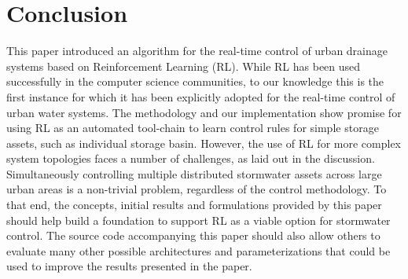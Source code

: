 \section{Conclusion}
This paper introduced an algorithm for the real-time control of urban drain\-age systems based on Reinforcement Learning (RL).
While RL has been used successfully in the computer science communities, to our knowledge this is the first instance for which it has been explicitly adopted for the real-time control of urban water systems.
The methodology and our implementation show promise for using RL as an automated tool-chain to learn control rules for simple storage assets, such as individual storage basin.
However, the use of RL for more complex system topologies faces a number of challenges, as laid out in the discussion.
Simultaneously controlling multiple distributed stormwater assets across large urban areas is a non-trivial problem, regardless of the control methodology.
To that end, the concepts, initial results and formulations provided by this paper should help build a foundation to support RL as a viable option for stormwater control.
The source code accompanying this paper should also allow others to evaluate many other possible architectures and parameterizations that could be used to improve the results presented in the paper.

